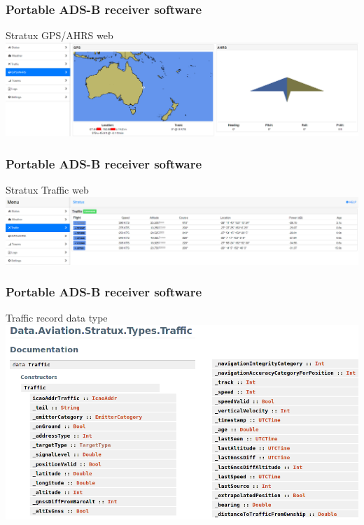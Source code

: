 \begin{frame}
\frametitle{Portable ADS-B receiver software}
\begin{block}{Stratux GPS/AHRS web}
\includegraphics[height=0.32\textheight]{image/stratux-gps-ahrs-web.png}
\end{block}
\end{frame}

\begin{frame}
\frametitle{Portable ADS-B receiver software}
\begin{block}{Stratux Traffic web}
\includegraphics[height=0.23\textheight]{image/stratux-traffic-web.png}
\end{block}
\end{frame}

\begin{frame}
\frametitle{Portable ADS-B receiver software}
\begin{block}{Traffic record data type}
\includegraphics[height=0.6\textheight]{image/stratux-traffic-record.png}
\end{block}
\end{frame}

